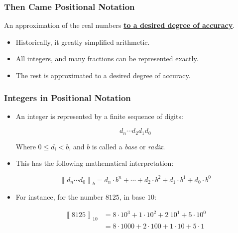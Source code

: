 \begin{frame}

\frametitle{Then Came Positional Notation}

\begin{center}

An approximation of the real numbers \textbf{\underline{to a desired degree of
accuracy}}.

\end{center}

\begin{itemize}

\item Historically, it greatly simplified arithmetic.

\item All integers, and many fractions can be represented exactly.

\item The rest is approximated to a desired degree of accuracy.

\end{itemize}

\end{frame}

\begin{frame}

\frametitle{Integers in Positional Notation}

\begin{itemize}

\item An integer is represented by a finite sequence of digits:

\[
d_n \cdots d_2 d_1 d_0
\]

Where $0 \leq d_i < b$, and $b$ is called a \emph{base} or \emph{radix}.

\item This has the following mathematical interpretation:

\[
\left\llbracket d_n \cdots d_0 \right\rrbracket_b =
d_n \cdot b^n + \cdots + d_2 \cdot b^2 + d_1 \cdot b^1 + d_0 \cdot b^0
\]

\item For instance, for the number $8125$, in base $10$:

\begin{align*}
\left\llbracket 8125 \right\rrbracket_{10} &=
8 \cdot 10^3 + 1 \cdot 10^2 + 2^\cdot 10^1 + 5 \cdot 10^0 \\
&= 8\cdot 1000 + 2 \cdot 100 + 1 \cdot 10 + 5 \cdot 1
\end{align*}

\end{itemize}

\end{frame}

